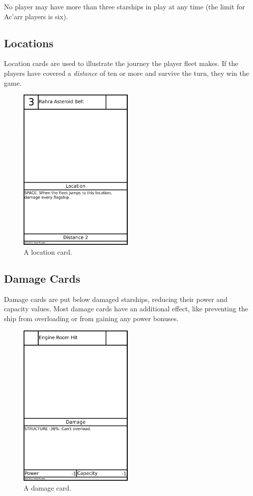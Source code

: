 \documentclass[11pt, a4paper]{article}
\begin{document}
No player may have more than three starships in play at any time (the limit for
Ac'arr players is six).

\subsection{Locations}

Location cards are used to illustrate the journey the player fleet makes. If
the players have covered a \emph{distance} of ten or more and survive the turn,
they win the game.

\begin{figure}
  \centering
  \includegraphics[width=0.5\textwidth]{examplelocation.png}
  \caption{A location card.}
\end{figure}

\subsection{Damage Cards}

Damage cards are put below damaged starships, reducing their power and capacity
values. Most damage cards have an additional effect, like preventing the ship
from overloading or from gaining any power bonuses.

\begin{figure}
  \centering
  \includegraphics[width=0.5\textwidth]{exampledamage.png}
  \caption{A damage card.}
\end{figure}
\end{document}

